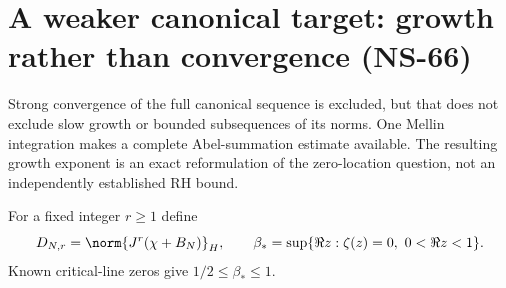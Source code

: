 \section{A weaker canonical target: growth rather than convergence (NS-66)}
\label{sec:ns66-canonical-growth}

Strong convergence of the full canonical sequence is excluded, but
that does not exclude slow growth or bounded subsequences of its norms.
One Mellin integration makes a complete Abel-summation estimate
available. The resulting growth exponent is an exact reformulation
of the zero-location question, not an independently established RH bound.

For a fixed integer $r\geq1$ define
\[
 D_{N,r}=\norm{J^r(\chi+B_N)}_H,\qquad
 \beta_* =\sup\{\Re z:\zeta(z)=0,\ 0<\Re z<1\}.
\]
Known critical-line zeros give $1/2\leq\beta_*\leq1$.

